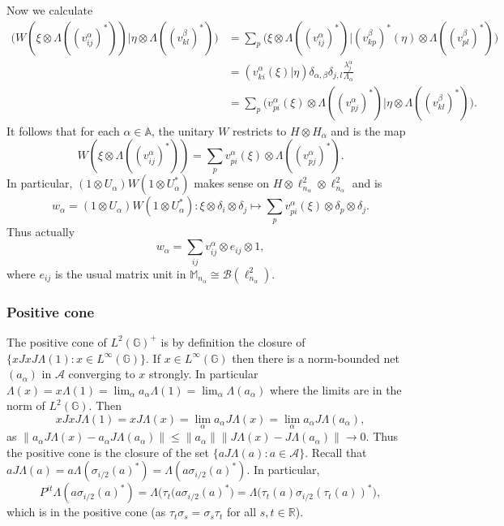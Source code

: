 \documentclass[twoside,a4paper,12pt]{article}
\theoremstyle{plain}
\theoremstyle{definition}
\newcommand{\mc}{\mathcal}
\newcommand{\G}{{\mathbb G}}
\begin{document}
Now we calculate
\begin{align*} \big( W(\xi\otimes\Lambda((v^\alpha_{ij})^*)) \big|
   \eta\otimes\Lambda((v^\beta_{kl})^*) \big)
&= \sum_p \big( \xi \otimes \Lambda((v^\alpha_{ij})^*) \big|
   (v^\beta_{kp})^*(\eta) \otimes \Lambda((v^\beta_{pl})^*) \big) \\
&= ( v^\alpha_{ki}(\xi) | \eta ) \delta_{\alpha,\beta}
   \delta_{j,l} \frac{\lambda^\alpha_j}{\Lambda_\alpha} \\
&= \sum_p \big (v^\alpha_{pi}(\xi) \otimes \Lambda((v^\alpha_{pj})^*) \big|
   \eta \otimes \Lambda((v^\beta_{kl})^*) \big).
\end{align*}
It follows that for each $\alpha\in\mathbb A$, the unitary $W$ restricts
to $H\otimes H_\alpha$ and is the map
\[ W(\xi\otimes\Lambda((v^\alpha_{ij})^*))
= \sum_p v^\alpha_{pi}(\xi) \otimes \Lambda((v^\alpha_{pj})^*). \]
In particular, $(1\otimes U_\alpha)W(1\otimes U_\alpha^*)$ makes sense
on $H \otimes \ell^2_{n_\alpha} \otimes \ell^2_{n_\alpha}$ and is
\[ w_\alpha = (1\otimes U_\alpha)W(1\otimes U_\alpha^*):
\xi\otimes\delta_i\otimes\delta_j \mapsto
\sum_p v^\alpha_{pi}(\xi) \otimes \delta_p \otimes \delta_j. \]
Thus actually
\[ w_\alpha = \sum_{ij} v^\alpha_{ij} \otimes e_{ij} \otimes 1, \]
where $e_{ij}$ is the usual matrix unit in $\mathbb M_{n_\alpha}
\cong \mc B(\ell^2_{n_\alpha})$.

\subsubsection{Positive cone}

The positive cone of $L^2(\G)^+$ is by definition the closure of
$\{ x JxJ \Lambda(1) : x\in L^\infty(\G) \}$.	If $x\in L^\infty(\G)$
then there is a norm-bounded net $(a_\alpha)$ in $\mc A$ converging to $x$
strongly.  In particular $\Lambda(x) = x\Lambda(1) = \lim_\alpha
a_\alpha \Lambda(1) = \lim_\alpha \Lambda(a_\alpha)$ where the limits are
in the norm of $L^2(\G)$.  Then
\[ x JxJ \Lambda(1) = x J \Lambda(x)
= \lim_\alpha a_\alpha J\Lambda(x)
= \lim_\alpha a_\alpha J\Lambda(a_\alpha), \]
as $\| a_\alpha J\Lambda(x) - a_\alpha J\Lambda(a_\alpha)\|
\leq \|a_\alpha \| \|J\Lambda(x) - J\Lambda(a_\alpha)\| \rightarrow 0$.
Thus the positive cone is the closure of the set
$\{ aJ\Lambda(a) : a\in\mc A \}$.  Recall that $aJ\Lambda(a)
= a\Lambda(\sigma_{i/2}(a)^*) = \Lambda(a \sigma_{i/2}(a)^*)$.  In particular,
\[ P^{it} \Lambda(a \sigma_{i/2}(a)^*)
= \Lambda\big( \tau_t(a \sigma_{i/2}(a)^* \big)
= \Lambda\big( \tau_t(a) \sigma_{i/2}(\tau_t(a))^* \big), \]
which is in the positive cone (as $\tau_t\sigma_s = \sigma_s\tau_t$ for all
$s,t\in\mathbb R$).
\end{document}
